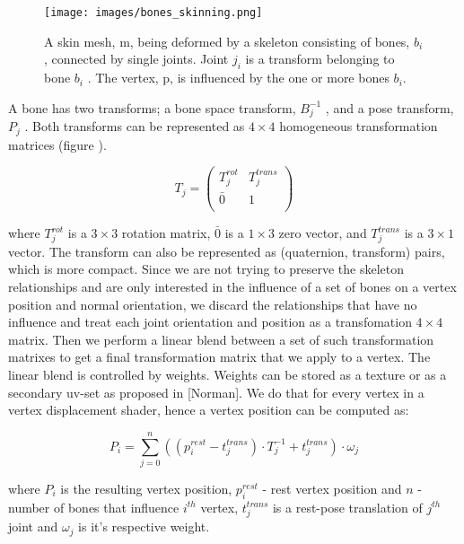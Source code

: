 \documentclass{acmsiggraph}
\begin{document}
\begin{figure}[ht]
  \centering
  \texttt{[image: images/bones\_skinning.png]}
  \caption{A skin mesh, m, being deformed by a skeleton consisting of bones, \(b_i\) , connected by single joints. Joint \(j_i\) is a transform belonging to bone \(b_i\) . The vertex, p, is influenced by the one or more bones \(b_i\).}
  \label{bones}
\end{figure}

A bone has two transforms; a bone space transform, \( B^{-1}_j\) , and a pose transform, \(P_j\) . Both transforms can be represented as \(4 \times 4\) homogeneous transformation matrices (figure \pageref{bones}).

\begin{equation} 
  T_j =
  \begin{pmatrix}
    T^{rot}_j & T^{trans}_j \\
    \bar 0 & 1 \\
  \end{pmatrix}
\end{equation} 

where $ T^{rot}_j$ is a $3 \times 3$ rotation matrix, $\bar 0$ is a $1 \times 3$ zero vector, and $T^{trans}_j$ is a $3 \times 1$ vector. The transform can also be represented as (quaternion, transform) pairs, which is more compact.
Since we are not trying to preserve the skeleton relationships and are only interested in the influence of a set of bones on a vertex position and normal orientation, we discard the relationships that have no influence and treat each joint orientation and position as a transfomation $4 \times 4$ matrix.  Then we perform a linear blend between a set of such transformation matrixes to get a final transformation matrix that we apply to a vertex.  The linear blend is controlled by weights.  Weights can be stored as a texture or as a secondary uv-set as proposed in [Norman]. We do that for every vertex in a vertex displacement shader, hence a vertex position can be computed as:

\begin{equation}
  P_i = \sum^n_{j=0} ((p^{rest}_i - t^{trans}_j) \cdot T^{-1}_j + t^{trans}_j) \cdot \omega_j
\end{equation}

where $P_i$ is the resulting vertex position, $p^{rest}_i$ - rest vertex position and $n$ - number of bones that influence $i^{th}$ vertex, $t^{trans}_j$ is a rest-pose translation of $j^{th}$ joint and $\omega_j$ is it's respective weight.
\end{document}
